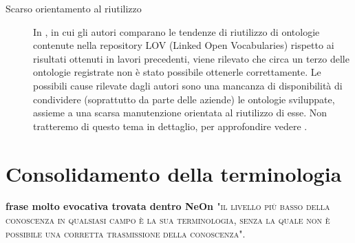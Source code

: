 \begin{description}
	\item[Scarso orientamento al riutilizzo] In \cite{whyareontologiesnotreused}, in cui gli autori comparano le tendenze di riutilizzo di ontologie contenute nella repository LOV (Linked Open Vocabularies) rispetto ai risultati ottenuti in lavori precedenti, viene rilevato che circa un terzo delle ontologie registrate non è stato possibile ottenerle correttamente. Le possibili cause rilevate dagli autori sono una mancanza di disponibilità di condividere (soprattutto da parte delle aziende) le ontologie sviluppate, assieme a una scarsa manutenzione orientata al riutilizzo di esse. Non tratteremo di questo tema in dettaglio, per approfondire vedere \cite{ontology2014summit, feasibilityStudy}.
	
\end{description}

\section{Consolidamento della terminologia}
\label{sec:consolidamentoTerminologia}

\textbf{frase molto evocativa trovata dentro NeOn \cite{NeOn}} \textsc{"il livello più basso della conoscenza in qualsiasi campo è la sua terminologia, senza la quale non è possibile una corretta trasmissione della conoscenza"}.


